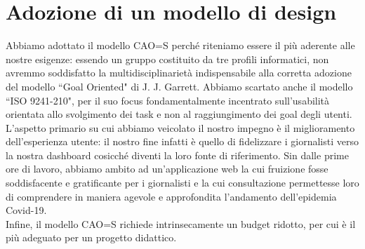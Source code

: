 \section{Adozione di un modello di design}

Abbiamo adottato il modello CAO=S perché riteniamo essere il più aderente alle nostre esigenze: essendo un gruppo costituito da tre profili informatici, non avremmo soddisfatto la multidisciplinarietà indispensabile alla corretta adozione del modello ``Goal Oriented" di J. J. Garrett.
Abbiamo scartato anche il modello ``ISO 9241-210", per il suo focus fondamentalmente incentrato sull'usabilità orientata allo svolgimento dei task e non al raggiungimento dei goal degli utenti.
L'aspetto primario su cui abbiamo veicolato il nostro impegno è il miglioramento dell'esperienza utente: il nostro fine infatti è quello di fidelizzare i giornalisti verso la nostra dashboard cosicché diventi la loro fonte di riferimento.
Sin dalle prime ore di lavoro, abbiamo ambito ad un'applicazione web la cui fruizione fosse soddisfacente e gratificante per i giornalisti e la cui consultazione permettesse loro di comprendere in maniera agevole e approfondita l'andamento dell'epidemia Covid-19.\\
Infine, il modello CAO=S richiede intrinsecamente un budget ridotto, per cui è il più adeguato per un progetto didattico. 